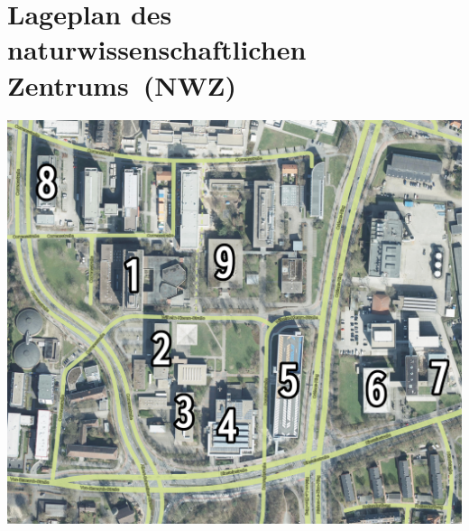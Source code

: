 
\section[Lageplan des naturwiss.\ Zentrums~(NWZ)]{Lageplan des naturwissenschaftlichen Zentrums~(NWZ)}

\includegraphics[width=\textwidth]{res/lageplan/physikvonoben_edit.jpg}

\vspace{3\baselineskip}

